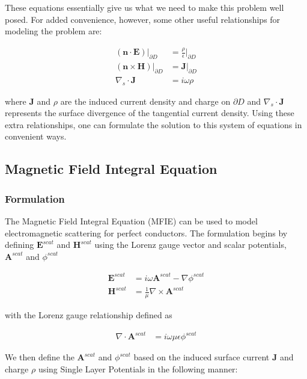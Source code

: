 \documentclass{article}[12pt]
\newcommand{\bvec}[1]{\boldsymbol{#1}}
\begin{document}
	These equations essentially give us what we need to make this problem well posed. For added convenience, however, some other useful relationships for modeling the problem are:
	
		\begin{align*}
		\left(\bvec{n} \cdot \bvec{E} \right)|_{\partial D} &= \frac{\rho}{\epsilon}|_{\partial D} \\
		\left(\bvec{n} \times \bvec{H} \right)|_{\partial D} &= \bvec{J}|_{\partial D} \\
		\nabla_s \cdot \bvec{J} &= i \omega \rho
		\end{align*}

	where $\bvec{J}$ and $\rho$ are the induced current density and charge on $\partial D$ and $\nabla_s \cdot \bvec{J}$ represents the surface divergence of the tangential current density. Using these extra relationships, one can formulate the solution to this system of equations in convenient ways.

	

	
	\subsection{Magnetic Field Integral Equation}
	\subsubsection{Formulation}
	The Magnetic Field Integral Equation (MFIE) can be used to model electromagnetic scattering for perfect conductors. The formulation begins by defining $\bvec{E}^{scat}$ and $\bvec{H}^{scat}$ using the Lorenz gauge vector and scalar potentials, $\bvec{A}^{scat}$ and $\phi^{scat}$
	
	\begin{align*}
	\bvec{E}^{scat} &= i \omega \bvec{A}^{scat} - \nabla \phi^{scat} \\
	\bvec{H}^{scat} &= \frac{1}{\mu} \nabla \times \bvec{A}^{scat}
	\end{align*}
	
	with the Lorenz gauge relationship defined as
	
	\begin{align*}
	\nabla \cdot \bvec{A}^{scat} &= i \omega \mu \epsilon \phi^{scat}
	\end{align*}
	
	We then define the $\bvec{A}^{scat}$ and $\phi^{scat}$ based on the induced surface current $\bvec{J}$ and charge $\rho$ using Single Layer Potentials in the following manner:
	
\end{document}
